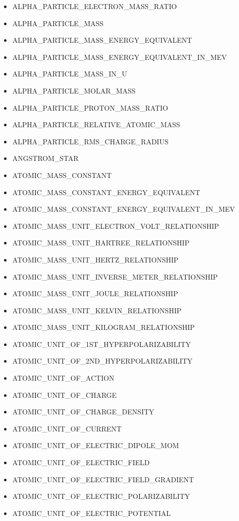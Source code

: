 \begin{itemize}
\item ALPHA\_PARTICLE\_ELECTRON\_MASS\_RATIO
\item ALPHA\_PARTICLE\_MASS
\item ALPHA\_PARTICLE\_MASS\_ENERGY\_EQUIVALENT
\item ALPHA\_PARTICLE\_MASS\_ENERGY\_EQUIVALENT\_IN\_MEV
\item ALPHA\_PARTICLE\_MASS\_IN\_U
\item ALPHA\_PARTICLE\_MOLAR\_MASS
\item ALPHA\_PARTICLE\_PROTON\_MASS\_RATIO
\item ALPHA\_PARTICLE\_RELATIVE\_ATOMIC\_MASS
\item ALPHA\_PARTICLE\_RMS\_CHARGE\_RADIUS
\item ANGSTROM\_STAR
\item ATOMIC\_MASS\_CONSTANT
\item ATOMIC\_MASS\_CONSTANT\_ENERGY\_EQUIVALENT
\item ATOMIC\_MASS\_CONSTANT\_ENERGY\_EQUIVALENT\_IN\_MEV
\item ATOMIC\_MASS\_UNIT\_ELECTRON\_VOLT\_RELATIONSHIP
\item ATOMIC\_MASS\_UNIT\_HARTREE\_RELATIONSHIP
\item ATOMIC\_MASS\_UNIT\_HERTZ\_RELATIONSHIP
\item ATOMIC\_MASS\_UNIT\_INVERSE\_METER\_RELATIONSHIP
\item ATOMIC\_MASS\_UNIT\_JOULE\_RELATIONSHIP
\item ATOMIC\_MASS\_UNIT\_KELVIN\_RELATIONSHIP
\item ATOMIC\_MASS\_UNIT\_KILOGRAM\_RELATIONSHIP
\item ATOMIC\_UNIT\_OF\_1ST\_HYPERPOLARIZABILITY
\item ATOMIC\_UNIT\_OF\_2ND\_HYPERPOLARIZABILITY
\item ATOMIC\_UNIT\_OF\_ACTION
\item ATOMIC\_UNIT\_OF\_CHARGE
\item ATOMIC\_UNIT\_OF\_CHARGE\_DENSITY
\item ATOMIC\_UNIT\_OF\_CURRENT
\item ATOMIC\_UNIT\_OF\_ELECTRIC\_DIPOLE\_MOM
\item ATOMIC\_UNIT\_OF\_ELECTRIC\_FIELD
\item ATOMIC\_UNIT\_OF\_ELECTRIC\_FIELD\_GRADIENT
\item ATOMIC\_UNIT\_OF\_ELECTRIC\_POLARIZABILITY
\item ATOMIC\_UNIT\_OF\_ELECTRIC\_POTENTIAL

\end{itemize}
